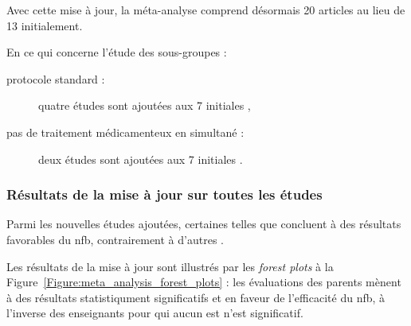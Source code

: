 Avec cette mise à jour, la méta-analyse comprend désormais 20 articles au lieu de 13 initialement.

En ce qui concerne l'étude des sous-groupes :
\begin{description}
\item[protocole standard :] quatre études sont ajoutées \citep{Strehl2017, Baumeister2016, Aggensteiner2019, Minder2018} aux 7 initiales \citep{Bakhshayesh2011,
Christiansen2014, Gevensleben2009, Beauregard2006, Holtmann2009, Heinrich2004, Linden1996},
\item[pas de traitement médicamenteux en simultané :] deux études sont ajoutées \citep{Bazanova2018, Moreno2019} aux 7 initiales \citep{Beauregard2006, 
Gevensleben2009, Bakhshayesh2011, Arnold2014, Linden1996, Christiansen2014, Maurizio2014}.
\end{description}

\subsubsection{Résultats de la mise à jour sur toutes les études}

Parmi les nouvelles études ajoutées, certaines telles que \citet{Shereena2019, Strehl2017} concluent à des résultats favorables du \gls{nfb},
contrairement à d'autres \citep{Moreno2019, Minder2018}.

Les résultats de la mise à jour sont illustrés par les \textit{forest plots} à la Figure~\ref{Figure:meta_analysis_forest_plots} : les évaluations
des parents mènent à des résultats statistiqument significatifs et en faveur de l'efficacité du \gls{nfb}, à l'inverse des enseignants pour qui
aucun \gls{est} n'est significatif.

